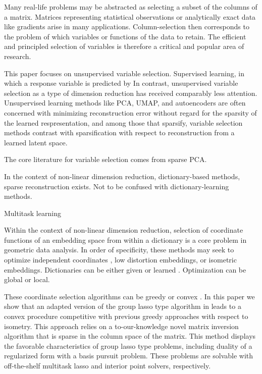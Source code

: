 \documentclass[a4paper,11pt]{article}
\begin{document}
Many real-life problems may be abstracted as selecting a subset of the columns of a matrix.
Matrices representing statistical observations or analytically exact data like gradients arise in many applications.
Column-selection then corresponds to the problem of which variables or functions of the data to retain. %
The efficient and principled selection of variables is therefore a critical and popular area of research.

This paper focuses on unsupervised variable selection.
Supervised learning, in which a response variable is predicted by
In contrast, unsupervised variable selection as a type of dimension reduction has received comparably less attention.
Unsupervised learning methods like PCA, UMAP, and autoencoders are often concerned with minimizing reconstruction error without regard for the sparsity of the learned respresentation, and among those that sparsify, variable selection methods contrast with sparsification with respect to reconstruction from a learned latent space.

The core literature for variable selection comes from sparse PCA. %

In the context of non-linear dimension reduction, dictionary-based methods, sparse reconstruction exists.
Not to be confused with dictionary-learning methods.

Multitask learning \cite{Hastie2015-qa}

Within the context of non-linear dimension reduction, selection of coordinate functions of an embedding space from within a dictionary is a core problem in geometric data analysis.  %
In order of specificity, these methods may seek to optimize independent coordinates \cite{Chen2019-km, He2023-ch}, low distortion embeddings, or isometric embeddings.
Dictionaries can be either given \cite{Koelle2022-ju, Koelle2024-no} or learned \cite{Kohli2021-lr}.
Optimization can be global or local.

These coordinate selection algorithms can be greedy \cite{NEURIPS2019_6a10bbd4, Kohli2021-lr, Jones2007-uc} or convex \cite{Koelle2022-ju, Koelle2024-no}.
In this paper we show that an adapted version of the group lasso type algorithm in \cite{Koelle2024-no} leads to a convex procedure competitive with previous greedy approaches with respect to isometry.
This approach relies on a to-our-knowledge novel matrix inversion algorithm that is sparse in the column space of the matrix.
This method displays the favorable characteristics of group lasso type problems, including duality of a regularized form with a basis pursuit problem.
These problems are solvable with off-the-shelf multitask lasso and interior point solvers, respectively.
\end{document}
